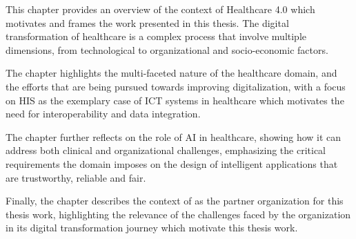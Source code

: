 This chapter provides an overview of the context of Healthcare 4.0 which motivates and frames the work presented in this thesis. 
%
The digital transformation of healthcare is a complex process that involve multiple dimensions, from technological to organizational and socio-economic factors.

The chapter highlights the multi-faceted nature of the healthcare domain, and the efforts that are being pursued towards improving digitalization, with a focus on \ac{HIS} as the exemplary case of \ac{ICT} systems in healthcare which motivates the need for interoperability and data integration.

The chapter further reflects on the role of \ac{AI} in healthcare, showing how it can address both clinical and organizational challenges, emphasizing the critical requirements the domain imposes on the design of intelligent applications that are trustworthy, reliable and fair.

Finally, the chapter describes the context of \ausl{} as the partner organization for this thesis work, highlighting the relevance of the challenges faced by the organization in its digital transformation journey which motivate this thesis work. 